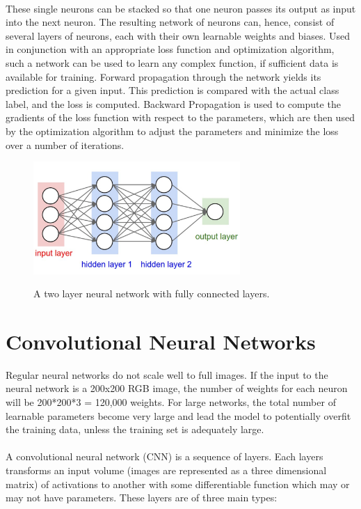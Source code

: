 \documentclass[12pt, a4paper]{report}
\begin{document}
\paragraph{}
These single neurons can be stacked so that one neuron passes its output as input into the next neuron. The resulting network of neurons can, hence, consist of several layers of neurons, each with their own learnable weights and biases. Used in conjunction with an appropriate loss function and optimization algorithm, such a network can be used to learn any complex function, if sufficient data is available for training. Forward propagation through the network yields its prediction for a given input. This prediction is compared with the actual class label, and the loss is computed. Backward Propagation is used to compute the gradients of the loss function with respect to the parameters, which are then used by the optimization algorithm to adjust the parameters and minimize the loss over a number of iterations.
\begin{figure}[h]
\centering
\includegraphics[width=0.7\textwidth]{nn2.png}
\caption{A two layer neural network with fully connected layers.}\cite{cs231n}
\end{figure}
\newpage

\section{Convolutional Neural Networks}
Regular neural networks do not scale well to full images. If the input to the neural network is a 200x200 RGB image, the number of weights for each neuron will be 200*200*3 = 120,000 weights. For large networks, the total number of learnable parameters become very large and lead the model to potentially overfit the training data, unless the training set is adequately large.
\paragraph{}
A convolutional neural network (CNN) is a sequence of layers. Each layers transforms an input volume (images are represented as a three dimensional matrix) of activations to another with some differentiable function which may or may not have parameters.\cite{cs231n, dlai4} These layers are of three main types:
\end{document}
